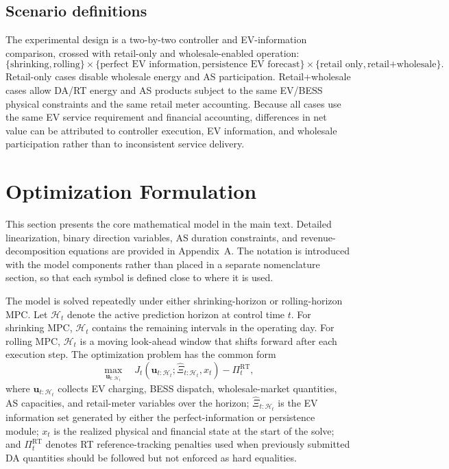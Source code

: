 \documentclass[final,5p,times]{elsarticle}
\newcommand{\RT}{\mathrm{RT}}
\newcommand{\calH}{\mathcal{H}}
\begin{document}
\subsection{Scenario definitions}
The experimental design is a two-by-two controller and EV-information comparison, crossed with retail-only and wholesale-enabled operation:
\begin{equation}
\{\text{shrinking},\text{rolling}\}
\times
\{\text{perfect EV information},\text{persistence EV forecast}\}
\times
\{\text{retail only},\text{retail+wholesale}\}.
\end{equation}
Retail-only cases disable wholesale energy and AS participation. Retail+wholesale cases allow DA/RT energy and AS products subject to the same EV/BESS physical constraints and the same retail meter accounting. Because all cases use the same EV service requirement and financial accounting, differences in net value can be attributed to controller execution, EV information, and wholesale participation rather than to inconsistent service delivery.
\section{Optimization Formulation}
This section presents the core mathematical model in the main text. Detailed linearization, binary direction variables, AS duration constraints, and revenue-decomposition equations are provided in Appendix~A. The notation is introduced with the model components rather than placed in a separate nomenclature section, so that each symbol is defined close to where it is used.

The model is solved repeatedly under either shrinking-horizon or rolling-horizon MPC. Let $\calH_t$ denote the active prediction horizon at control time $t$. For shrinking MPC, $\calH_t$ contains the remaining intervals in the operating day. For rolling MPC, $\calH_t$ is a moving look-ahead window that shifts forward after each execution step. The optimization problem has the common form
\begin{equation}
\label{eq:mpc_master}
\max_{\mathbf{u}_{t:\calH_t}}
\quad
J_t(\mathbf{u}_{t:\calH_t};\widehat{\Xi}_{t:\calH_t},x_t)
-
\Pi_t^{\RT},
\end{equation}
where $\mathbf{u}_{t:\calH_t}$ collects EV charging, BESS dispatch, wholesale-market quantities, AS capacities, and retail-meter variables over the horizon; $\widehat{\Xi}_{t:\calH_t}$ is the EV information set generated by either the perfect-information or persistence module; $x_t$ is the realized physical and financial state at the start of the solve; and $\Pi_t^{\RT}$ denotes RT reference-tracking penalties used when previously submitted DA quantities should be followed but not enforced as hard equalities.
\end{document}

